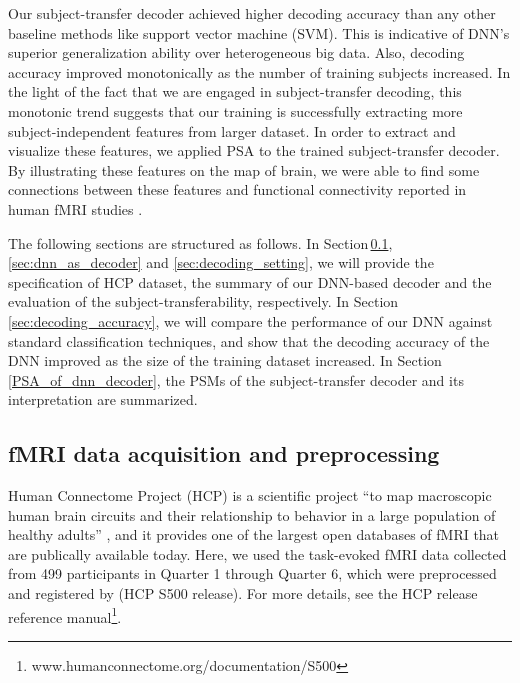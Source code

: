 Our subject-transfer decoder achieved higher decoding accuracy than any
other baseline methods like support vector machine (SVM).
%
This is indicative of DNN's superior generalization ability over heterogeneous big data.
%
Also, decoding accuracy improved monotonically as the number of training subjects increased.
%
In the light of the fact that we are engaged in subject-transfer
decoding, this monotonic trend suggests that our training is
successfully extracting more subject-independent features from larger
dataset.
%
In order to extract and visualize these features, we applied PSA to the
trained subject-transfer decoder.
%
By illustrating these features on the map of brain, we were able to find
some connections between these features and functional connectivity
reported in human fMRI studies \cite{raichle2001default,raichle2007default,taylor2009two,cole2013multi}.

The following sections are structured as follows.
%
In Section\,\ref{sec:fmri_data_specification},
\ref{sec:dnn_as_decoder} and \ref{sec:decoding_setting}, we will provide
the specification of HCP dataset, the summary of our DNN-based decoder
and the evaluation of the subject-transferability, respectively.
%
In Section\,\ref{sec:decoding_accuracy}, we will compare the
performance of our DNN against standard classification techniques, and
show that the decoding accuracy of the DNN improved as the size of the
training dataset increased.
%
In Section\,\ref{PSA_of_dnn_decoder}, the PSMs of the subject-transfer
decoder and its interpretation are summarized.


\subsection{fMRI data acquisition and preprocessing}
\label{sec:fmri_data_specification}
Human Connectome Project (HCP) is a scientific project ``to map macroscopic human brain circuits and their relationship to behavior in a large population of healthy adults'' \cite{van2013wu}, and it provides one of the largest open databases of fMRI that are publically available today.
%
Here, we used the task-evoked fMRI data collected from 499 participants in Quarter 1 through Quarter 6,
which were  preprocessed and registered by \cite{van2013wu,glasser2013minimal} (HCP S500 release).
%
For more details, see the HCP release reference manual\footnote{www.humanconnectome.org/documentation/S500}.

